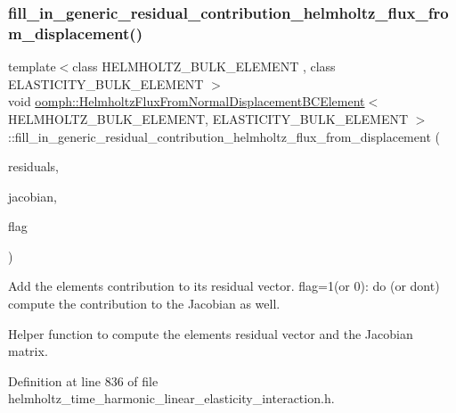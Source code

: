 \subsubsection{\texorpdfstring{fill\+\_\+in\+\_\+generic\+\_\+residual\+\_\+contribution\+\_\+helmholtz\+\_\+flux\+\_\+from\+\_\+displacement()}{fill\_in\_generic\_residual\_contribution\_helmholtz\_flux\_from\_displacement()}}
{\footnotesize\ttfamily template$<$class H\+E\+L\+M\+H\+O\+L\+T\+Z\+\_\+\+B\+U\+L\+K\+\_\+\+E\+L\+E\+M\+E\+NT , class E\+L\+A\+S\+T\+I\+C\+I\+T\+Y\+\_\+\+B\+U\+L\+K\+\_\+\+E\+L\+E\+M\+E\+NT $>$ \\
void \hyperlink{classoomph_1_1HelmholtzFluxFromNormalDisplacementBCElement}{oomph\+::\+Helmholtz\+Flux\+From\+Normal\+Displacement\+B\+C\+Element}$<$ H\+E\+L\+M\+H\+O\+L\+T\+Z\+\_\+\+B\+U\+L\+K\+\_\+\+E\+L\+E\+M\+E\+NT, E\+L\+A\+S\+T\+I\+C\+I\+T\+Y\+\_\+\+B\+U\+L\+K\+\_\+\+E\+L\+E\+M\+E\+NT $>$\+::fill\+\_\+in\+\_\+generic\+\_\+residual\+\_\+contribution\+\_\+helmholtz\+\_\+flux\+\_\+from\+\_\+displacement (\begin{DoxyParamCaption}\item[{\hyperlink{classoomph_1_1Vector}{Vector}$<$ double $>$ \&}]{residuals,  }\item[{\hyperlink{classoomph_1_1DenseMatrix}{Dense\+Matrix}$<$ double $>$ \&}]{jacobian,  }\item[{const unsigned \&}]{flag }\end{DoxyParamCaption})\hspace{0.3cm}{\ttfamily [private]}}



Add the element\textquotesingle{}s contribution to its residual vector. flag=1(or 0)\+: do (or don\textquotesingle{}t) compute the contribution to the Jacobian as well. 

Helper function to compute the element\textquotesingle{}s residual vector and the Jacobian matrix. 

Definition at line 836 of file helmholtz\+\_\+time\+\_\+harmonic\+\_\+linear\+\_\+elasticity\+\_\+interaction.\+h.




